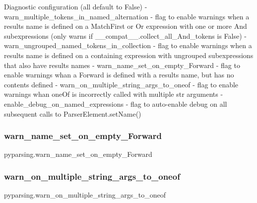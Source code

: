 \begin{DoxyVerb}Diagnostic configuration (all default to False)
 - warn_multiple_tokens_in_named_alternation - flag to enable warnings when a results
   name is defined on a MatchFirst or Or expression with one or more And subexpressions
   (only warns if __compat__.collect_all_And_tokens is False)
 - warn_ungrouped_named_tokens_in_collection - flag to enable warnings when a results
   name is defined on a containing expression with ungrouped subexpressions that also
   have results names
 - warn_name_set_on_empty_Forward - flag to enable warnings whan a Forward is defined
   with a results name, but has no contents defined
 - warn_on_multiple_string_args_to_oneof - flag to enable warnings whan oneOf is
   incorrectly called with multiple str arguments
 - enable_debug_on_named_expressions - flag to auto-enable debug on all subsequent
   calls to ParserElement.setName()
\end{DoxyVerb}
 \mbox{\label{namespacepyparsing_abd7b3ceae5de7e98982573176ca2ffa1}} 
\subsubsection{\texorpdfstring{warn\+\_\+name\+\_\+set\+\_\+on\+\_\+empty\+\_\+\+Forward}{warn\_name\_set\_on\_empty\_Forward}}
{\footnotesize\ttfamily pyparsing.\+warn\+\_\+name\+\_\+set\+\_\+on\+\_\+empty\+\_\+\+Forward}

\mbox{\label{namespacepyparsing_a54dcb097557af387ec19dc45be5b0f28}} 
\subsubsection{\texorpdfstring{warn\+\_\+on\+\_\+multiple\+\_\+string\+\_\+args\+\_\+to\+\_\+oneof}{warn\_on\_multiple\_string\_args\_to\_oneof}}
{\footnotesize\ttfamily pyparsing.\+warn\+\_\+on\+\_\+multiple\+\_\+string\+\_\+args\+\_\+to\+\_\+oneof}

